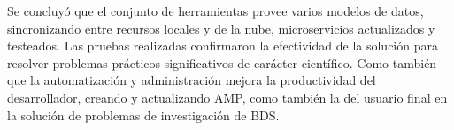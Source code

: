 Se concluyó que el conjunto de herramientas provee varios modelos de datos,
sincronizando entre recursos locales y de la nube, microservicios actualizados y testeados. 
Las pruebas realizadas confirmaron la efectividad de la solución para resolver
problemas prácticos significativos de carácter científico. Como también que la automatización y administración 
mejora la productividad del desarrollador, creando y actualizando AMP, como también la del usuario final en la 
solución de problemas de investigación de BDS.
